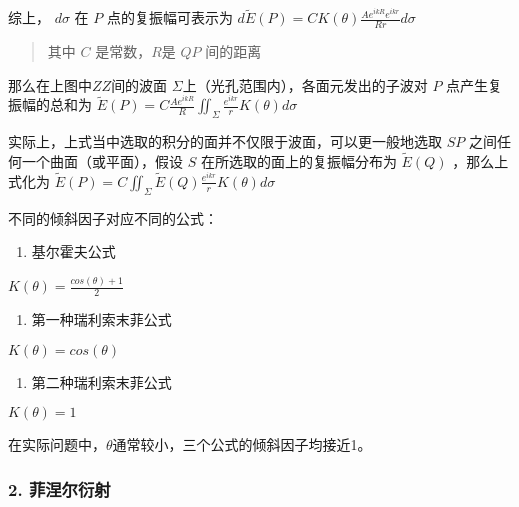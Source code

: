 \documentclass[letterpaper,10pt,english]{sphinxmanual}
\begin{document}
\sphinxAtStartPar
综上， \(d\sigma\)  在 \(P\) 点的复振幅可表示为
\(d\tilde{E}(P)=CK(\theta)\frac{Ae^{ikR}e^{ikr}}{Rr}d\sigma\)
\begin{quote}

\sphinxAtStartPar
其中 \(C\) 是常数，\(R\)是 \(QP\) 间的距离
\end{quote}

\sphinxAtStartPar
那么在上图中\(ZZ\)间的波面 \(Σ\)上（光孔范围内），各面元发出的子波对 \(P\) 点产生复振幅的总和为
\(\tilde{E}(P)=C\frac{Ae^{ikR}}{R}\iint_{\Sigma}{\frac{e^{ikr}}{r}K(\theta)d\sigma}\)

\sphinxAtStartPar
实际上，上式当中选取的积分的面并不仅限于波面，可以更一般地选取 \(SP\) 之间任何一个曲面（或平面），假设 \(S\) 在所选取的面上的复振幅分布为 \(\tilde{E}(Q)\) ，那么上式化为
\(\tilde{E}(P)=C\iint_{\Sigma}{\tilde{E}(Q)\frac{e^{ikr}}{r}K(\theta)d\sigma}\)

\sphinxAtStartPar
不同的倾斜因子对应不同的公式：
\begin{enumerate}
%
\item {} 
\sphinxAtStartPar
基尔霍夫公式

\end{enumerate}

\sphinxAtStartPar
\(K(\theta)=\frac{cos(\theta)+1}{2}\)
\begin{enumerate}
%
\setcounter{enumi}{1}
\item {} 
\sphinxAtStartPar
第一种瑞利\textendash{}索末菲公式

\end{enumerate}

\sphinxAtStartPar
\(K(\theta)=cos(\theta)\)
\begin{enumerate}
%
\setcounter{enumi}{2}
\item {} 
\sphinxAtStartPar
第二种瑞利\textendash{}索末菲公式

\end{enumerate}

\sphinxAtStartPar
\(K(\theta)=1\)

\sphinxAtStartPar
在实际问题中，\(\theta\)通常较小，三个公式的倾斜因子均接近1。


\subsubsection{2. 菲涅尔衍射}
\label{\detokenize{_u7b80_u4ecb/_u6838_u5fc3_u8bbe_u8ba1_u4f18_u5316_u7b97_u6cd5/_u8fdc_u573a_u4f20_u64ad_u6a21_u5757/contents:id3}}
\end{document}
